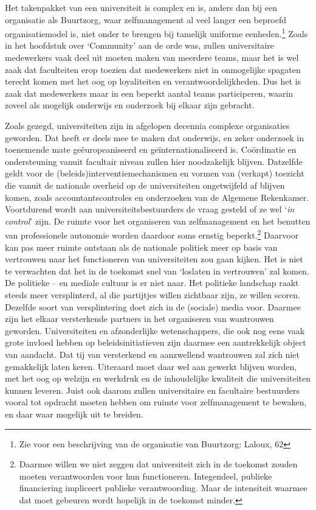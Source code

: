 \documentclass[smallauthor, chapterhaspagenum, nochapterinheader, pagenuminheader,  bigchapnum,medium2, tocpages,  garamond, titleinheader]{jote-book}
\begin{document}
	Het takenpakket van een universiteit is complex en is, anders dan bij een organisatie als Buurtzorg, waar zelfmanagement al veel langer een beproefd organisatiemodel is, niet onder te brengen bij tamelijk uniforme eenheden.\footnote{Zie voor een beschrijving van de organisatie van Buurtzorg: Laloux, 62} Zoals in het hoofdstuk over ‘Community' aan de orde was, zullen universitaire medewerkers vaak deel uit moeten maken van meerdere teams, maar het is wel zaak dat faculteiten erop toezien dat medewerkers niet in onmogelijke spagaten terecht komen met het oog op loyaliteiten en verantwoordelijkheden. Dus het is zaak dat medewerkers maar in een beperkt aantal teams participeren, waarin zoveel als mogelijk onderwijs en onderzoek bij elkaar zijn gebracht.



	Zoals gezegd, universiteiten zijn in afgelopen decennia complexe organisaties geworden. Dat heeft er deels mee te maken dat onderwijs, en zeker onderzoek in toenemende mate geëuropeaniseerd en geïnternationaliseerd is. Coördinatie en ondersteuning vanuit facultair niveau zullen hier noodzakelijk blijven. Datzelfde geldt voor de (beleids)interventiemechanismen en vormen van (verkapt) toezicht die vanuit de nationale overheid op de universiteiten ongetwijfeld af blijven komen, zoals accountantscontroles en onderzoeken van de Algemene Rekenkamer. Voortdurend wordt aan universiteitsbestuurders de vraag gesteld of ze wel ‘\emph{in control}' zijn. De ruimte voor het organiseren van zelfmanagement en het benutten van professionele autonomie worden daardoor soms ernstig beperkt.\footnote{Daarmee willen we niet zeggen dat universiteit zich in de toekomst zouden moeten verantwoorden voor hun functioneren. Integendeel, publieke financiering impliceert publieke verantwoording. Maar de intensiteit waarmee dat moet gebeuren wordt hopelijk in de toekomst minder.} Daarvoor kan pas meer ruimte ontstaan als de nationale politiek meer op basis van vertrouwen naar het functioneren van universiteiten zou gaan kijken. Het is niet te verwachten dat het in de toekomst snel van ‘loslaten in vertrouwen' zal komen. De politieke -- en mediale cultuur is er niet naar. Het politieke landschap raakt steeds meer versplinterd, al die partijtjes willen zichtbaar zijn, ze willen scoren. Dezelfde soort van versplintering doet zich in de (sociale) media voor. Daarmee zijn het elkaar versterkende partners in het organiseren van wantrouwen geworden. Universiteiten en afzonderlijke wetenschappers, die ook nog eens vaak grote invloed hebben op beleidsinitiatieven zijn daarmee een aantrekkelijk object van aandacht. Dat tij van versterkend en aanzwellend wantrouwen zal zich niet gemakkelijk laten keren. Uiteraard moet daar wel aan gewerkt blijven worden, met het oog op welzijn en werkdruk en de inhoudelijke kwaliteit die universiteiten kunnen leveren. Juist ook daarom zullen universitaire en facultaire bestuurders vooral tot opdracht moeten hebben om ruimte voor zelfmanagement te bewaken, en daar waar mogelijk uit te breiden.
\end{document}
